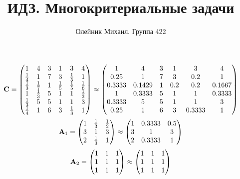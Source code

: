 \documentclass[10pt,a4paper]{article}
\title{ИДЗ. Многокритериальные задачи}
\author{Олейник Михаил. Группа 422}
\begin{document}
	\maketitle
	
	\[
		\bold{C} = 
		\begin{pmatrix}
			{1} {} & {{4}} {} & {{3}} {} & {1} {} & {{3}} {} & {{4}} {} \\
			\frac{1} {{4}} & {1} {} & {{7}} {} & {{3}} {} & \frac{1} {{5}} & {1} {} \\
			\frac{1} {{3}} & \frac{1} {{7}} & {1} {} & \frac{1} {{5}} & \frac{1} {{5}} & \frac{1} {{6}} \\
			{1} {} & \frac{1} {{3}} & {{5}} {} & {1} {} & {1} {} & \frac{1} {{3}} \\
			\frac{1} {{3}} & {{5}} {} & {{5}} {} & {1} {} & {1} {} & {{3}} {} \\
			\frac{1} {{4}} & {1} {} & {{6}} {} & {{3}} {} & \frac{1} {{3}} & {1} {} \\
		\end{pmatrix}
		\approx
		\begin{pmatrix}
			1        & 4        & 3        & 1        & 3        & 4        \\
			0.25     & 1        & 7        & 3        & 0.2      & 1        \\
			0.3333   & 0.1429   & 1        & 0.2      & 0.2      & 0.1667   \\
			1        & 0.3333   & 5        & 1        & 1        & 0.3333   \\
			0.3333   & 5        & 5        & 1        & 1        & 3        \\
			0.25     & 1        & 6        & 3        & 0.3333   & 1        \\
		\end{pmatrix}
	\]
	\[
		\bold{A}_{1} = 
		\begin{pmatrix}
			{1} {} & \frac{1} {{3}} & \frac{1} {{2}} \\
			{{3}} {} & {1} {} & {{3}} {} \\
			{{2}} {} & \frac{1} {{3}} & {1} {} \\
		\end{pmatrix}
		\approx
		\begin{pmatrix}
			1        & 0.3333   & 0.5      \\
			3        & 1        & 3        \\
			2        & 0.3333   & 1        \\
		\end{pmatrix}
	\]
	\[
		\bold{A}_{2} = 
		\begin{pmatrix}
			{1} {} & {1} {} & {1} {} \\
			{1} {} & {1} {} & {1} {} \\
			{1} {} & {1} {} & {1} {} \\
		\end{pmatrix}
		\approx
		\begin{pmatrix}
			1        & 1        & 1        \\
			1        & 1        & 1        \\
			1        & 1        & 1        \\
		\end{pmatrix}
	\]
\end{document}
